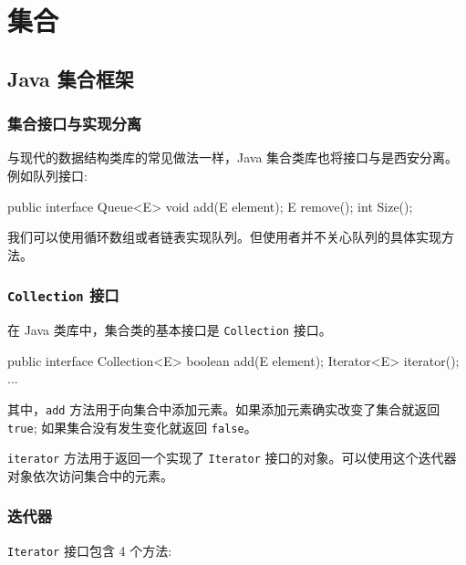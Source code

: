 \section{集合}
\subsection{Java 集合框架}
\subsubsection{集合接口与实现分离}


与现代的数据结构类库的常见做法一样，Java 集合类库也将接口与是西安分离。例如队列接口:

\begin{Java}
public interface Queue<E> {
    void add(E element);
    E remove();
    int Size();
}
\end{Java}

我们可以使用循环数组或者链表实现队列。但使用者并不关心队列的具体实现方法。

\subsubsection{\texttt{Collection} 接口}

在 Java 类库中，集合类的基本接口是 \texttt{Collection} 接口。

\begin{Java}
public interface Collection<E> {
    boolean add(E element);
    Iterator<E> iterator();
    ...
}
\end{Java}

其中，\texttt{add} 方法用于向集合中添加元素。如果添加元素确实改变了集合就返回 \texttt{true}; 如果集合没有发生变化就返回 \texttt{false}。

\texttt{iterator} 方法用于返回一个实现了 \texttt{Iterator} 接口的对象。可以使用这个迭代器对象依次访问集合中的元素。

\subsubsection{迭代器}

\texttt{Iterator} 接口包含 4 个方法:

